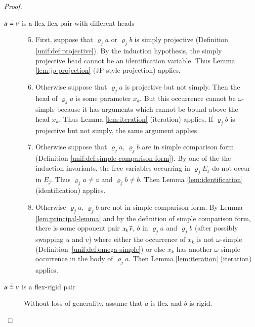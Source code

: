 \begin{proof}
\begin{description}
\begin{enumerate}[beginpenalty=1000]
    \end{enumerate}
    


    \item[\mbox{$u \unif v$} is a flex-flex pair with different heads] \hfill
    \begin{enumerate}
      \setcounter{enumi}{4}
      \item First, suppose that
      $\varrho_j a$ or $\varrho_j b$ is simply projective
      (Definition \ref{unif:def:projective}). 
      By the induction hypothesis, the simply projective head 
      cannot be an identification variable.
      Thus Lemma \ref{lem:jp-projection} (JP-style projection) applies.
      
      \item {} 
      Otherwise suppose that 
      $\varrho_j a$ is projective but not simply.
      Then the head of $\varrho_j a$ is some parameter $x_{k}$. But
      this occurrence cannot be $\omega$-simple because it has arguments
      which cannot be bound above the head $x_{k}$. Thus Lemma \ref{lem:iteration}
      (iteration) applies.
      If $\varrho_j b$ is projective but not simply, the same argument applies.

      \item Otherwise suppose that $\varrho_j a$, $\varrho_j b$ are in simple
      comparison form (Definition \ref{unif:def:simple-comparison-form}).
      By one of the the induction invariants,
      the free variables occurring in $\varrho_{j}E_{j}$ do not occur in $E_{j}$.
      Thus $\varrho_{j} a \not= a$ and $\varrho_{j} b \not= b$.
      Then Lemma \ref{lem:identification} (identification) applies.

      \item Otherwise $\varrho_j a$, $\varrho_j b$ are not in simple comparison
      form. By Lemma \ref{lem:principal-lemma} and by the definition of simple comparison form,
      there is some opponent pair $x_{k}\,\overline{r}$, $ b$
      in $\varrho_j a$ and $\varrho_j b$
      (after possibly swapping $u$ and $v$) where either the occurrence
      of $x_{k}$ is not $\omega$-simple (Definition~\ref{unif:def:omega-simple}) or else
      $x_{k}$ has another $\omega$-simple occurrence in the body of $\varrho_j a$.
      Then Lemma \ref{lem:iteration} 
      (iteration) applies.
    \end{enumerate}
    
    \item[$u \unif v$ is a flex-rigid pair]
    Without loss of generality, assume that $a$ is flex and $b$ is rigid.\hfill


\end{description}
\end{proof}
